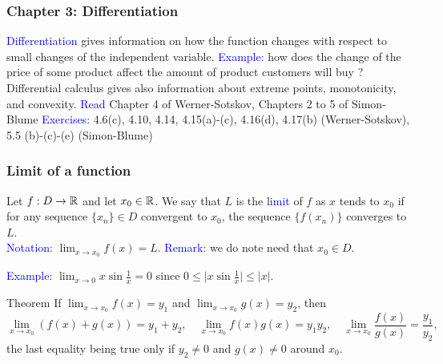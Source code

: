 \documentclass[11pt,aspectratio=169]{beamer}
\begin{document}
\begin{frame}
\frametitle{Chapter 3: Differentiation}
 \textcolor{blue}{Differentiation} gives information on how the function changes with respect to small changes of the independent variable.
\vskip 12pt
\textcolor{blue}{Example:} how does the change of the price of some product affect the amount of product customers will buy ?
\vskip 12pt
Differential calculus gives also information about extreme points, monotonicity, and convexity.
\vskip 12pt
\textcolor{blue}{Read} Chapter 4 of Werner-Sotskov, Chapters 2 to 5 of Simon-Blume
\vskip 12pt
\textcolor{blue}{Exercises:} 4.6(c), 4.10, 4.14, 4.15(a)-(c), 4.16(d), 4.17(b) (Werner-Sotskov), 5.5 (b)-(c)-(e) (Simon-Blume)


\end{frame}


\begin{frame}
\frametitle{Limit of a function}
\begin{alertblock}{}
Let $f:D  \rightarrow \mathbb R$ and let $x_0 \in \mathbb R$. We say that $L$ is the l\textcolor{blue}{imit} of $f$ as $x$ tends to $x_0$ if for any sequence $\{x_n\} \in D$ convergent to $x_0$, the sequence
$\{f(x_n)\}$ converges to $L$. 	\\[3mm]
\textcolor{blue}{Notation:} $\lim_{x \rightarrow x_0} f(x)=L$. \textcolor{blue}{Remark:} we do note need that $x_0 \in D$.
\end{alertblock}
 \textcolor{blue}{Example:} $\lim_{x \rightarrow 0} x \sin\frac{1}{x}=0$ since $0\leq \vert x \sin\frac{1}{x}\vert \leq \vert x \vert$.
\begin{block}{Theorem}
	If $\lim_{x \rightarrow x_0} f(x)=y_1$ and $\lim_{x \rightarrow x_0} g(x)=y_2$,
then $$\lim_{x \rightarrow x_0} (f(x)+g(x))=y_1+y_2, \quad\lim_{x \rightarrow x_0} f(x)g(x)=y_1y_2,
\quad\lim_{x \rightarrow x_0} \frac{f(x)}{g(x)}=\frac{y_1}{y_2},$$
the last equality being true only if $y_2\neq0$ and $g(x) \neq 0$ around $x_0$.
\end{block}

\end{frame}
\end{document}
